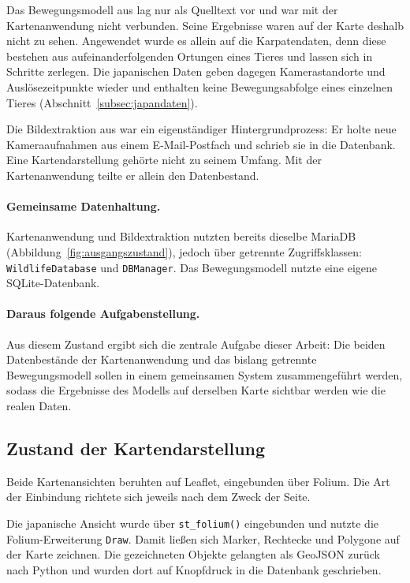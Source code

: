 \documentclass[12pt,a4paper]{report}
\begin{document}
Das Bewegungsmodell aus \cite{BreuBA} lag
nur als Quelltext vor und war mit der Kartenanwendung nicht verbunden. Seine Ergebnisse
waren auf der Karte deshalb nicht zu sehen. Angewendet wurde es allein auf die
Karpatendaten, denn diese bestehen aus aufeinanderfolgenden Ortungen eines Tieres und lassen
sich in Schritte zerlegen. Die japanischen Daten geben dagegen Kamerastandorte und
Auslösezeitpunkte wieder und enthalten keine Bewegungsabfolge eines einzelnen Tieres
(Abschnitt~\ref{subsec:japandaten}).

Die Bildextraktion aus \cite{LelchatBA} war ein eigenständiger
Hintergrundprozess: Er holte neue Kameraaufnahmen aus einem E-Mail-Postfach und schrieb
sie in die Datenbank. Eine Kartendarstellung gehörte nicht zu seinem Umfang. Mit der
Kartenanwendung teilte er allein den Datenbestand.

\paragraph{Gemeinsame Datenhaltung.} Kartenanwendung und Bildextraktion nutzten
bereits dieselbe MariaDB (Abbildung~\ref{fig:ausgangszustand}), jedoch über getrennte
Zugriffsklassen: \texttt{WildlifeDatabase} und \texttt{DBManager}.
Das Bewegungsmodell nutzte eine eigene SQLite-Datenbank.

\paragraph{Daraus folgende Aufgabenstellung.} Aus diesem Zustand ergibt sich die zentrale
Aufgabe dieser Arbeit: Die beiden Datenbestände der Kartenanwendung und das bislang
getrennte Bewegungsmodell sollen in einem gemeinsamen System zusammengeführt werden, sodass
die Ergebnisse des Modells auf derselben Karte sichtbar werden wie die realen Daten.



\subsection{Zustand der Kartendarstellung}
\label{subsec:ausgangszustand-karte}

Beide Kartenansichten beruhten auf Leaflet, eingebunden über Folium. Die Art der Einbindung
richtete sich jeweils nach dem Zweck der Seite.

Die japanische Ansicht wurde über \texttt{st\_folium()} eingebunden und nutzte die
Folium-Erweiterung \texttt{Draw}. Damit ließen sich Marker, Rechtecke und Polygone auf der
Karte zeichnen. Die gezeichneten Objekte gelangten als GeoJSON zurück nach Python und wurden
dort auf Knopfdruck in die Datenbank geschrieben.
\end{document}
